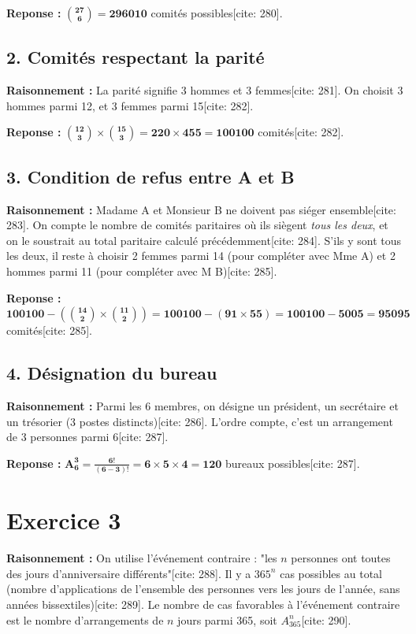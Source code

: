 \documentclass[11pt,a4paper]{article}
\begin{document}
\textbf{Reponse :} $\mathbf{\binom{27}{6} = 296010}$ comités possibles[cite: 280].

\subsection*{2. Comités respectant la parité}

\textbf{Raisonnement :} La parité signifie 3 hommes et 3 femmes[cite: 281]. On choisit 3 hommes parmi 12, et 3 femmes parmi 15[cite: 282].

\textbf{Reponse :} $\mathbf{\binom{12}{3} \times \binom{15}{3} = 220 \times 455 = 100100}$ comités[cite: 282].

\subsection*{3. Condition de refus entre A et B}

\textbf{Raisonnement :} Madame A et Monsieur B ne doivent pas siéger ensemble[cite: 283]. On compte le nombre de comités paritaires où ils siègent \textit{tous les deux}, et on le soustrait au total paritaire calculé précédemment[cite: 284]. S'ils y sont tous les deux, il reste à choisir 2 femmes parmi 14 (pour compléter avec Mme A) et 2 hommes parmi 11 (pour compléter avec M B)[cite: 285].

\textbf{Reponse :} $\mathbf{100100 - \left( \binom{14}{2} \times \binom{11}{2} \right) = 100100 - (91 \times 55) = 100100 - 5005 = 95095}$ comités[cite: 285].

\subsection*{4. Désignation du bureau}

\textbf{Raisonnement :} Parmi les 6 membres, on désigne un président, un secrétaire et un trésorier (3 postes distincts)[cite: 286]. L'ordre compte, c'est un arrangement de 3 personnes parmi 6[cite: 287].

\textbf{Reponse :} $\mathbf{A_6^3 = \frac{6!}{(6-3)!} = 6 \times 5 \times 4 = 120}$ bureaux possibles[cite: 287].

\hrulefill

\section*{Exercice 3}

\textbf{Raisonnement :} On utilise l'événement contraire : "les $n$ personnes ont toutes des jours d'anniversaire différents"[cite: 288]. Il y a $365^n$ cas possibles au total (nombre d'applications de l'ensemble des personnes vers les jours de l'année, sans années bissextiles)[cite: 289]. Le nombre de cas favorables à l'événement contraire est le nombre d'arrangements de $n$ jours parmi 365, soit $A_{365}^n$[cite: 290].
\end{document}
